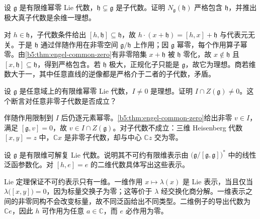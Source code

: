 \begin{exercise}\label{b5:ex:12-normalizer-nilpotent}
	设 \(\mathfrak g\) 是有限维幂零 Lie 代数，\(\mathfrak h\subsetneq\mathfrak g\) 是子代数。证明 \(N_{\mathfrak g}(\mathfrak h)\) 严格包含 \(\mathfrak h\)，并推出极大真子代数是余维一理想。
\end{exercise}
\begin{solution}
	对 \(h\in\mathfrak h\)，子代数条件给出 \([h,\mathfrak h]\subseteq\mathfrak h\)，故 \(h\cdot(x+\mathfrak h)=[h,x]+\mathfrak h\) 与代表元无关。于是 \(\mathfrak h\) 通过伴随作用在非零空间 \(\mathfrak g/\mathfrak h\) 上作用；因 \(\mathfrak g\) 幂零，每个作用算子幂零。由\cref{b5:thm:engel-common-zero}有非零陪集 \(x+\mathfrak h\) 被 \(\mathfrak h\) 零化，故 \(x\notin\mathfrak h\) 且 \([x,\mathfrak h]\subseteq\mathfrak h\)，得到严格包含。若 \(\mathfrak h\) 极大，正规化子只能是 \(\mathfrak g\)，故它为理想。商若维数大于一，其中任意直线的逆像都是严格介于二者的子代数，矛盾。
\end{solution}

\begin{exercise}\label{b5:ex:12-central-intersection}
	设 \(\mathfrak g\) 是任意域上的有限维幂零 Lie 代数，\(I\ne0\) 是理想。证明 \(I\cap Z(\mathfrak g)\ne0\)。这个断言对任意非零子代数是否成立？
\end{exercise}
\begin{solution}
	伴随作用限制到 \(I\) 后仍逐元素幂零。\cref{b5:thm:engel-common-zero}给出非零 \(v\in I\)，满足 \([\mathfrak g,v]=0\)，故 \(v\in I\cap Z(\mathfrak g)\)。对子代数不成立：三维 Heisenberg 代数 \([x,y]=z\) 中，\(\mathbb Cx\) 是非零子代数，却与中心 \(\mathbb Cz\) 交为零。
\end{solution}

\begin{exercise}\label{b5:ex:12-solvable-characters}
	设 \(\mathfrak g\) 是有限维可解复 Lie 代数。说明其不可约有限维表示由 \(\bigl(\mathfrak g/[\mathfrak g,\mathfrak g]\bigr)^*\) 中的线性泛函参数化。对 \([h,e]=e\) 的二维代数具体写出这些表示。
\end{exercise}
\begin{solution}
	Lie 定理保证不可约表示只有一维。一维作用 \(x\mapsto\lambda(x)\) 是 Lie 表示，当且仅当 \(\lambda\bigl([x,y]\bigr)=0\)，因为标量交换子为零；这等价于 \(\lambda\) 经交换化商分解。一维表示之间的非零同构不会改变标量，故不同泛函给出不同类型。二维例子的导出代数为 \(\mathbb Ce\)，因此 \(h\) 可作用为任意 \(a\in\mathbb C\)，而 \(e\) 必作用为零。
\end{solution}

